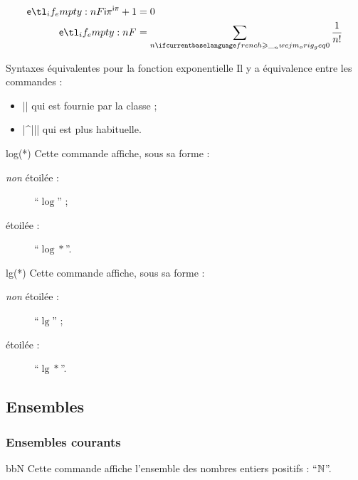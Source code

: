 \documentclass[french,nolocaltoc]{nwejmart}
\newtheorem[title=Fait,style=definition]{fact}
\begin{document}
\begin{bodycode}
\begin{align}
  \E[\I\pi]+1 & = 0 \\
  \E          & = \sum_{n\geq 0} \frac{1}{n!}
\end{align}
\end{bodycode}

\begin{dbremark}{Syntaxes équivalentes pour la fonction exponentielle}{}
  Il y a équivalence entre les commandes :
  \begin{itemize}
  \item || qui est fournie par la classe ;
  \item |\E^{||}| qui est plus habituelle.
\end{itemize}
\end{dbremark}

\begin{docCommand}{log(*)}{}
  Cette commande affiche, sous sa forme :
  \begin{description}
  \item[\emph{non} étoilée :] \enquote{$\log$} ;
  \item[étoilée :] \enquote{$\log*$}.
  \end{description}
\end{docCommand}

\begin{docCommand}{lg(*)}{}
  Cette commande affiche, sous sa forme :
  \begin{description}
  \item[\emph{non} étoilée :] \enquote{$\lg$} ;
  \item[étoilée :] \enquote{$\lg*$}.
  \end{description}
\end{docCommand}

\subsection{Ensembles}

\subsubsection{Ensembles courants}

\begin{docCommand}{bbN}{}
  Cette commande affiche l'ensemble des nombres entiers positifs :
  \enquote{$\mathbb{N}$}.
\end{docCommand}
\end{document}
